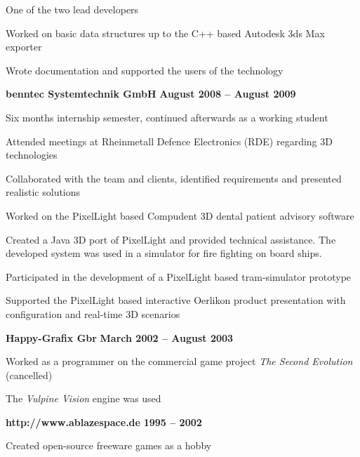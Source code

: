 \documentclass[margin,line]{Ofenberg_Resume}
\begin{document}
\begin{resume}
	\begin{list2}
		\item One of the two lead developers
		\item Worked on basic data structures up to the C++ based Autodesk 3ds Max exporter
		\item Wrote documentation and supported the users of the technology
	\end{list2}\vspace{-1.5mm}
	\textbf{benntec Systemtechnik GmbH} \hfill \textbf{August 2008 -- August 2009}\vspace{-3mm}\\\vspace{-1mm}%
	\begin{list2}
		\item Six months internship semester, continued afterwards as a working student
		\item Attended meetings at Rheinmetall Defence Electronics (RDE) regarding 3D technologies
		\item Collaborated with the team and clients, identified requirements and presented realistic solutions
		\item Worked on the PixelLight based Compudent 3D dental patient advisory software
		\item Created a Java 3D port of PixelLight and provided technical assistance. The developed system was used in a simulator for fire fighting on board ships.
		\item Participated in the development of a PixelLight based tram-simulator prototype
		\item Supported the PixelLight based interactive Oerlikon product presentation with configuration and real-time 3D scenarios
	\end{list2}\vspace{-1.5mm}
	\textbf{Happy-Grafix Gbr} \hfill \textbf{March 2002 -- August 2003}\vspace{-3mm}\\\vspace{-1mm}%
	\begin{list2}
		\item Worked as a programmer on the commercial game project \emph{The Second Evolution} (cancelled)
		\item The \emph{Vulpine Vision} engine was used
	\end{list2}\vspace{-1.5mm}
	\textbf{http://www.ablazespace.de} \hfill \textbf{1995 -- 2002}\vspace{-3mm}\\\vspace{-1mm}%
	\begin{list2}
		\item Created open-source freeware games as a hobby
	\end{list2}\vspace{-1.5mm}



\end{resume}
\end{document}

